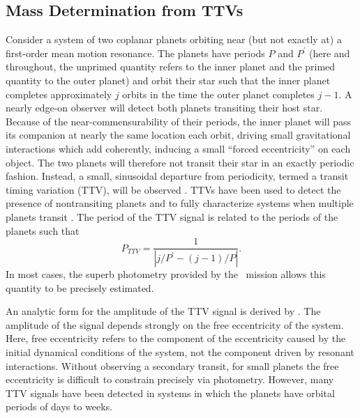 \subsection{Mass Determination from TTVs}

Consider a system of two coplanar planets orbiting near (but not exactly at) a first-order mean motion resonance. The planets have periods $P$ and $P^\prime$ (here and throughout, the unprimed quantity refers to the inner planet and the primed quantity to the outer planet) and orbit their star such that the inner planet completes approximately $j$ orbits in the time the outer planet completes $j-1$. A nearly edge-on observer will detect both planets transiting their host star. Because of the near-commensurability of their periods, the inner planet will pass its companion at nearly the same location each orbit, driving small gravitational interactions which add coherently, inducing a small “forced eccentricity” on each object. The two planets will therefore not transit their star in an exactly periodic fashion. Instead, a small, sinusoidal departure from periodicity, termed a transit timing variation (TTV), will be observed \citep[e.g.][]{Nesvorny12}. TTVs have been used to detect the presence of nontransiting planets \citep{Ballard11, Dawson12} and to fully characterize systems when multiple planets transit \citep{Holman10, Lissauer11}. The period of the TTV signal is related to the periods of the planets such that
\begin{equation}
P_{TTV} = \frac{1}{|j / P^\prime - (j-1) / P|}.
\end{equation}
In most cases, the superb photometry provided by the \kep\ mission allows this quantity to be precisely estimated. 

An analytic form for the amplitude of the TTV signal is derived by \citet[hereafter L12]{Lithwick12}. The amplitude of the signal depends strongly on the free eccentricity of the system. Here, free eccentricity refers to the component of the eccentricity caused by the initial dynamical conditions of the system, not the component driven by resonant interactions. Without observing a secondary transit, for small planets the free eccentricity is difficult to constrain precisely via photometry. However, many TTV signals have been detected in systems in which the planets have orbital periods of days to weeks. 

